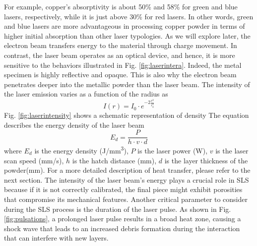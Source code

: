 For example, copper's absorptivity is about 50\% and 58\% for green and blue lasers, respectively, while it is just above 30\% for red lasers. In other words, green and blue lasers are more advantageous in processing copper powder in terms of higher initial absorption than other laser typologies. As we will explore later, the electron beam transfers energy to the material through charge movement. In contrast, the laser beam operates as an optical device, and hence, it is more sensitive to the behaviors illustrated in Fig. \ref{fig:laserintera}. Indeed, the metal specimen is highly reflective and opaque. This is also why the electron beam penetrates deeper into the metallic powder than the laser beam. The intensity of the laser emission varies as a function of the radius as 
\begin{equation}
    \label{eq:intensitylaser}
    I(r)=I_0\cdot e^{-2 \frac{r^2}{r_0^2}}
\end{equation}
Fig. \ref{fig:laserintensity} shows a schematic representation of density
The equation describes the energy density of the laser beam
\begin{equation}
    \label{eq:energydensity}
    E_d = \frac{P}{h\cdot v \cdot d}
\end{equation}
where $E_d$ is the energy density (\unit{\joule/\milli\metre^3}), $P$ is the laser power (\unit{\watt}), $v$ is the laser scan speed (\unit{\milli\metre / \second}), $h$ is the hatch distance (\unit{\milli\metre}), $d$ is the layer thickness of the powder(\unit{\milli\metre}). For a more detailed description of heat transfer, please refer to the next section. The intensity of the laser beam's energy plays a crucial role in SLS because if it is not correctly calibrated, the final piece might exhibit porosities that compromise its mechanical features. Another critical parameter to consider during the SLS process is the duration of the laser pulse. As shown in Fig. \ref{fig:pulsations}, a prolonged laser pulse results in a broad heat zone, causing a shock wave that leads to an increased debris formation during the interaction that can interfere with new layers.
